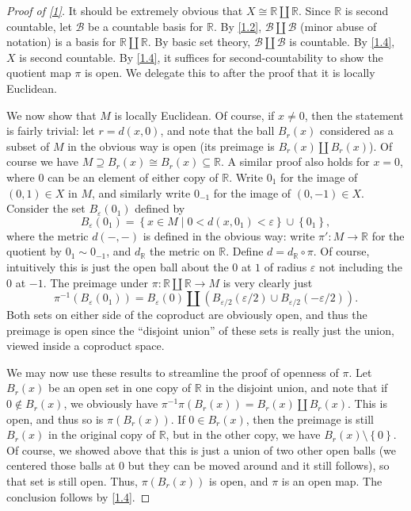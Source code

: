 \documentclass[11pt, letterpaper]{article}
\theoremstyle{theorem}
\begin{document}
\begin{proof}[Proof of \cref{1}]
	It should be extremely obvious that $X \cong \mathbb{R} \amalg \mathbb{R} $. Since $\mathbb{R} $ is second countable, let $\mathcal{B} $ be a countable basis for $\mathbb{R} $. By \cref{1.2}, $\mathcal{B} \amalg \mathcal{B} $ (minor abuse of notation) is a basis for $\mathbb{R} \amalg \mathbb{R} $. By basic set theory, $\mathcal{B} \amalg \mathcal{B} $ is countable. By \cref{1.4}, $X$ is second countable. By \cref{1.4}, it suffices for second-countability to show the quotient map $\pi $ is open. We delegate this to after the proof that it is locally Euclidean.

	We now show that $M$ is locally Euclidean. Of course, if $x\neq 0$, then the statement is fairly trivial: let $r=d(x,0)$, and note that the ball $B_r(x)$ considered as a subset of $M$ in the obvious way is open (its preimage is $B_r(x)\amalg B_r(x)$). Of course we have $M\supseteq B_r(x)\cong B_r(x)\subseteq \mathbb{R} $. A similar proof also holds for $x=0$, where $0$ can be an element of either copy of $\mathbb{R} $. Write $0_1$ for the image of $(0,1)\in X $ in $M$, and similarly write $0_{-1} $ for the image of $(0,-1)\in X$. Consider the set $B_\varepsilon (0_1)$ defined by
	\[
		B_\varepsilon (0_1)=\left\{ x\in M \mid 0<d(x,0_1)<\varepsilon  \right\} \cup \left\{ 0_1 \right\} ,
	\]
	where the metric $d(-,-)$ is defined in the obvious way: write $\pi' : M \to \mathbb{R} $ for the quotient by $0_1\sim 0_{-1} $, and $d_\mathbb{R} $ the metric on $\mathbb{R} $. Define $d= d_{\mathbb{R} } \circ \pi $. Of course, intuitively this is just the open ball about the 0 at $1$ of radius $\varepsilon $ not including the $0$ at $-1$. The preimage under $\pi : \mathbb{R} \amalg \mathbb{R}  \to M$ is very clearly just
	\[
		\pi ^{-1} (B_\varepsilon (0_1))=B_\varepsilon (0)\amalg (B_{\varepsilon /2} (\varepsilon /2)\cup B_{\varepsilon /2} (-\varepsilon /2))
	.\]
	Both sets on either side of the coproduct are obviously open, and thus the preimage is open since the ``disjoint union'' of these sets is really just the union, viewed inside a coproduct space.

	We may now use these results to streamline the proof of openness of $\pi $. Let $B_r(x)$ be an open set in one copy of $\mathbb{R} $ in the disjoint union, and note that if $0\notin B_r(x)$, we obviously have $\pi ^{-1} \pi (B_r(x))=B_r(x)\amalg B_r(x)$. This is open, and thus so is $\pi (B_r(x))$. If $0\in B_r(x)$, then the preimage is still $B_r(x)$ in the original copy of $\mathbb{R} $, but in the other copy, we have $B_r(x)\setminus \left\{ 0 \right\} $. Of course, we showed above that this is just a union of two other open balls (we centered those balls at 0 but they can be moved around and it still follows), so that set is still open. Thus, $\pi (B_r(x))$ is open, and $\pi $ is an open map. The conclusion follows by \cref{1.4}.


\end{proof}
\end{document}
